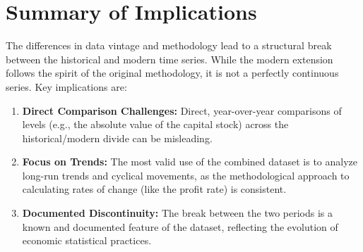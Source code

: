\documentclass[12pt,a4paper]{article}
\begin{document}
\section{Summary of Implications}
The differences in data vintage and methodology lead to a structural break between the historical and modern time series. While the modern extension follows the spirit of the original methodology, it is not a perfectly continuous series. Key implications are:
\begin{enumerate}
    \item \textbf{Direct Comparison Challenges:} Direct, year-over-year comparisons of levels (e.g., the absolute value of the capital stock) across the historical/modern divide can be misleading.
    \item \textbf{Focus on Trends:} The most valid use of the combined dataset is to analyze long-run trends and cyclical movements, as the methodological approach to calculating rates of change (like the profit rate) is consistent.
    \item \textbf{Documented Discontinuity:} The break between the two periods is a known and documented feature of the dataset, reflecting the evolution of economic statistical practices.
\end{enumerate}
\end{document}
